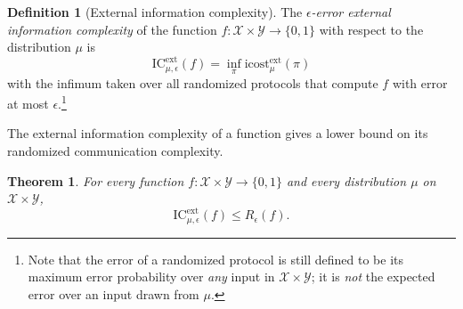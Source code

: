 \documentclass[11pt]{amsart}
\theoremstyle{plain}
\newtheorem{theorem}{Theorem}
\theoremstyle{definition}
\newtheorem{definition}{Definition}
\theoremstyle{plain}
\newcommand{\calX}{\mathcal{X}}
\newcommand{\calY}{\mathcal{Y}}
\newcommand{\ICext}{\mathrm{IC}^{\mathrm{ext}}}
\newcommand{\icostext}{\mathrm{icost}^{\mathrm{ext}}}
\begin{document}
\begin{definition}[External information complexity]
The \emph{$\epsilon$-error external information complexity} of the function $f : \calX \times \calY \to \{0,1\}$ with respect to the distribution $\mu$ is
\[
\ICext_{\mu,\epsilon}(f) = \inf_{\pi} \icostext_\mu(\pi)
\]
with the infimum taken over all randomized protocols that compute $f$ with error at most $\epsilon$.\footnote{Note that the error of a randomized protocol is still defined to be its maximum error probability over \emph{any} input in $\calX \times \calY$; it is \emph{not} the expected error over an input drawn from $\mu$.}
\end{definition}

The external information complexity of a function gives a lower bound on its randomized communication complexity.

\begin{theorem}
For every function $f : \calX \times \calY \to \{0,1\}$ and every distribution $\mu$ on $\calX \times \calY$,
\[
\ICext_{\mu,\epsilon}(f) \le R_\epsilon(f).
\]
\end{theorem}
\end{document}
